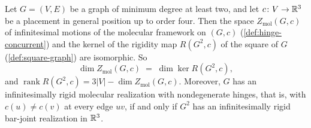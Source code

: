\begin{theorem}
  \label{thm:molecular-iff-square-bar-joint}
  \leanok
  Let $G = (V,E)$ be a graph of minimum degree at least two, and let
  $c \colon V \to {\mathbb{R}}^3$ be a placement in general position up to order
  four. Then the space $Z_{\mathrm{mol}}(G, c)$ of infinitesimal motions
  of the molecular framework on $(G, c)$ (\cref{def:hinge-concurrent})
  and the kernel of the rigidity map $R(G^2, c)$ of the square of $G$
  (\cref{def:square-graph}) are isomorphic. So
  \[
    \dim Z_{\mathrm{mol}}(G, c) \;=\; \dim \ker R(G^2, c),
  \]
  and $\operatorname{rank} R(G^2, c) = 3|V| - \dim Z_{\mathrm{mol}}(G, c)$.
  Moreover, $G$ has an infinitesimally rigid molecular realization with
  nondegenerate hinges, that is, with $c(u) \neq c(v)$ at every edge
  $uv$, if and only if $G^2$ has an infinitesimally rigid bar-joint
  realization in ${\mathbb{R}}^3$.
\end{theorem}
